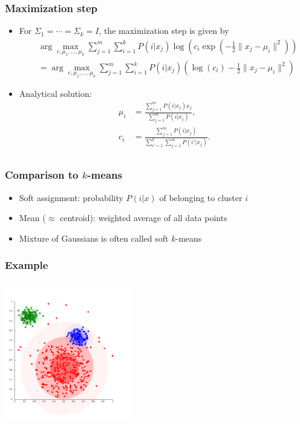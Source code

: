 \documentclass[10pt]{beamer}
\begin{document}
\begin{frame}
  \frametitle{Maximization step}
  \begin{itemize}
    \item For $\Sigma_1=\cdots=\Sigma_k=I$, the maximization step is given by
	\begin{align*}
	 & \arg \max_{c,\mu_1,\ldots,\mu_k} \sum_{j=1}^m \sum_{i=1}^k P(i|x_j) \log \left( c_i \exp \left( - \frac 1 2 \lVert x_j - \mu_i \rVert^2 \right) \right)\\
	 &= \arg \max_{c,\mu_1,\ldots,\mu_k} \sum_{j=1}^m \sum_{i=1}^k P(i|x_j) \left( \log(c_i) - \frac 1 2 \lVert x_j - \mu_i \rVert^2 \right)
	\end{align*}
	\pause
	\item {\color{red} Analytical solution}:
	\begin{align*}
	\mu_i &= \frac {\sum_{j=1}^m P(i|x_j) x_j} {\sum_{j=1}^m P(i|x_j)},\\
	c_i &= \frac {\sum_{j=1}^m P(i|x_j)} {\sum_{i'=1}^k \sum_{j=1}^m P(i'|x_j)}.\\
	\end{align*}
  \end{itemize}
\end{frame}

\begin{frame}
  \frametitle{Comparison to $k$-means}
  \begin{itemize}
    \item {\color{red} Soft assignment}: probability $P(i|x)$ of belonging to cluster $i$
	\item Mean ($\approx$ centroid): weighted average of {\color{red} all} data points
	\item Mixture of Gaussians is often called {\color{red} soft $k$-means}
  \end{itemize}
\end{frame}

\begin{frame}
  \frametitle{Example}
  \centerline{\includegraphics[height=6cm]{images/clustery.png}}
\end{frame}
\end{document}

